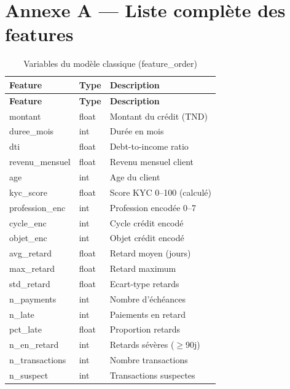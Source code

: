 \appendix
\chapter{Annexe A — Liste complète des features}
\label{ann:features}

\begin{longtable}{|p{4.5cm}|p{2cm}|p{7cm}|}
  \caption{Variables du modèle classique (feature\_order)} \\
  \hline
  \textbf{Feature} & \textbf{Type} & \textbf{Description} \\
  \hline
  \endfirsthead
  \hline
  \textbf{Feature} & \textbf{Type} & \textbf{Description} \\
  \hline
  \endhead
  montant & float & Montant du crédit (TND) \\
  \hline
  duree\_mois & int & Durée en mois \\
  \hline
  dti & float & Debt-to-income ratio \\
  \hline
  revenu\_mensuel & float & Revenu mensuel client \\
  \hline
  age & int & Age du client \\
  \hline
  kyc\_score & float & Score KYC 0--100 (calculé) \\
  \hline
  profession\_enc & int & Profession encodée 0--7 \\
  \hline
  cycle\_enc & int & Cycle crédit encodé \\
  \hline
  objet\_enc & int & Objet crédit encodé \\
  \hline
  avg\_retard & float & Retard moyen (jours) \\
  \hline
  max\_retard & float & Retard maximum \\
  \hline
  std\_retard & float & Ecart-type retards \\
  \hline
  n\_payments & int & Nombre d'échéances \\
  \hline
  n\_late & int & Paiements en retard \\
  \hline
  pct\_late & float & Proportion retards \\
  \hline
  n\_en\_retard & int & Retards sévères ($\geq$90j) \\
  \hline
  n\_transactions & int & Nombre transactions \\
  \hline
  n\_suspect & int & Transactions suspectes \\
  \hline

\end{longtable}

